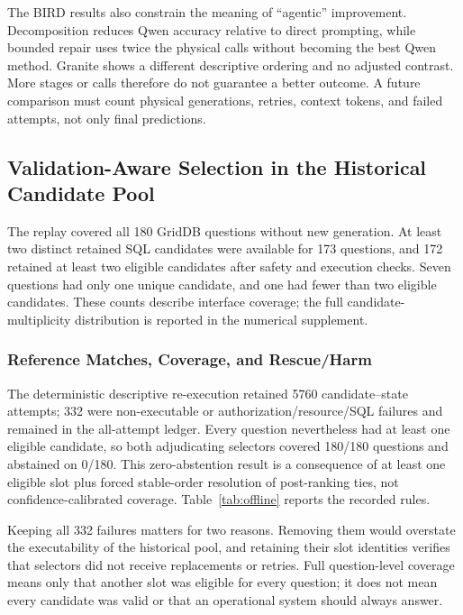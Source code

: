 \documentclass[applsci,article,submit,moreauthors]{Definitions/mdpi}
\begin{document}
The BIRD results also constrain the meaning of ``agentic'' improvement. Decomposition reduces Qwen accuracy relative to direct prompting, while bounded repair uses twice the physical calls without becoming the best Qwen method. Granite shows a different descriptive ordering and no adjusted contrast. More stages or calls therefore do not guarantee a better outcome. A future comparison must count physical generations, retries, context tokens, and failed attempts, not only final predictions.

\subsection{Validation-Aware Selection in the Historical Candidate Pool}

The replay covered all 180 GridDB questions without new generation. At least two distinct retained SQL candidates were available for 173 questions, and 172 retained at least two eligible candidates after safety and execution checks. Seven questions had only one unique candidate, and one had fewer than two eligible candidates. These counts describe interface coverage; the full candidate-multiplicity distribution is reported in the numerical supplement.

\subsubsection{Reference Matches, Coverage, and Rescue/Harm}

The deterministic descriptive re-execution retained 5760 candidate--state attempts; 332 were non-executable or authorization/resource/SQL failures and remained in the all-attempt ledger. Every question nevertheless had at least one eligible candidate, so both adjudicating selectors covered 180/180 questions and abstained on 0/180. This zero-abstention result is a consequence of at least one eligible slot plus forced stable-order resolution of post-ranking ties, not confidence-calibrated coverage. Table~\ref{tab:offline} reports the recorded rules.

Keeping all 332 failures matters for two reasons. Removing them would overstate the executability of the historical pool, and retaining their slot identities verifies that selectors did not receive replacements or retries. Full question-level coverage means only that another slot was eligible for every question; it does not mean every candidate was valid or that an operational system should always answer.
\end{document}
